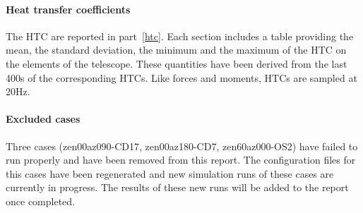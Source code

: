 \paragraph{Heat transfer coefficients}
The HTC are reported in part~\ref{htc}.
Each section includes a table providing the mean, the standard deviation, the minimum and the
maximum of the HTC  on the elements of the telescope.
These quantities have been derived from the last 400s of the corresponding HTCs.
Like forces and moments, HTCs are sampled at 20Hz.

\paragraph{Excluded cases}
Three cases (zen00az090-CD17,  zen00az180-CD7,  zen60az000-OS2) have failed to run properly and have been removed from this report.
The configuration files for this cases have been regenerated and new simulation runs of these cases are currently in progress.
The results of these new runs will be added to the report once completed.

